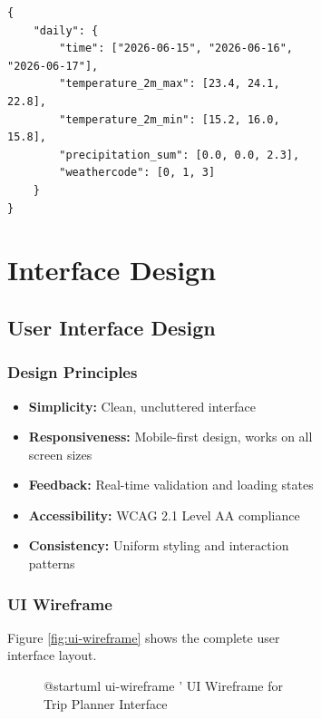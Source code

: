 \documentclass[12pt,a4paper]{report}
\begin{document}
\begin{figure}[H]
\begin{plantuml}
\begin{figure}[H]
\begin{plantuml}
\begin{lstlisting}[style=jsonStyle, caption={Open-Meteo API Response}]
{
    "daily": {
        "time": ["2026-06-15", "2026-06-16", "2026-06-17"],
        "temperature_2m_max": [23.4, 24.1, 22.8],
        "temperature_2m_min": [15.2, 16.0, 15.8],
        "precipitation_sum": [0.0, 0.0, 2.3],
        "weathercode": [0, 1, 3]
    }
}
\end{lstlisting}


\chapter{Interface Design}

\section{User Interface Design}

\subsection{Design Principles}

\begin{itemize}[leftmargin=*]
    \item \textbf{Simplicity:} Clean, uncluttered interface
    \item \textbf{Responsiveness:} Mobile-first design, works on all screen sizes
    \item \textbf{Feedback:} Real-time validation and loading states
    \item \textbf{Accessibility:} WCAG 2.1 Level AA compliance
    \item \textbf{Consistency:} Uniform styling and interaction patterns
\end{itemize}

\subsection{UI Wireframe}

Figure \ref{fig:ui-wireframe} shows the complete user interface layout.

\begin{figure}[H]
    \centering
    \begin{plantuml}
@startuml ui-wireframe
' UI Wireframe for Trip Planner Interface


\end{plantuml}
\end{figure}
\end{plantuml}
\end{figure}
\end{plantuml}
\end{figure}
\end{document}
